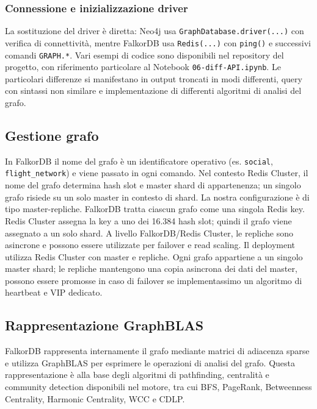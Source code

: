 \documentclass{article}
\begin{document}
\subsubsection{Connessione e inizializzazione driver}
La sostituzione del driver è diretta: Neo4j usa \texttt{GraphDatabase.driver(...)} con verifica di connettività, %
mentre FalkorDB usa \texttt{Redis(...)} con \texttt{ping()} e successivi comandi \texttt{GRAPH.*}.
Vari esempi di codice sono disponibili nel repository del progetto, con riferimento particolare al %
Notebook  \texttt{06-diff-API.ipynb}. Le particolari differenze si manifestano in output troncati in %
modi differenti, query con sintassi non similare e implementazione di differenti algoritmi di analisi del grafo. %


\subsection{Gestione grafo}
In FalkorDB il nome del grafo è un identificatore operativo (es. \texttt{social}, \texttt{flight\_network}) %
e viene passato in ogni comando. %
Nel contesto Redis Cluster, il nome del grafo determina hash slot e master shard di appartenenza; %
un singolo grafo risiede su un solo master in contesto di shard. La nostra configurazione è di tipo master-repliche.
FalkorDB tratta ciascun grafo come una singola Redis key. %
Redis Cluster assegna la key a uno dei 16.384 hash slot; quindi il grafo viene assegnato a un solo shard. %
A livello FalkorDB/Redis Cluster, le repliche sono asincrone e possono essere utilizzate per failover e read scaling.
Il deployment utilizza Redis Cluster con master e repliche. Ogni grafo appartiene a un singolo master shard; %
le repliche mantengono una copia asincrona dei dati del master, possono essere promosse in caso di failover se %
implementassimo un algoritmo di heartbeat e VIP dedicato.



\subsection{Rappresentazione GraphBLAS}

FalkorDB rappresenta internamente il grafo mediante matrici di adiacenza %
sparse e utilizza GraphBLAS per esprimere le operazioni di analisi del grafo. %
Questa rappresentazione è alla base degli algoritmi di %
pathfinding, centralità e community detection disponibili nel motore, tra cui BFS, %
PageRank, Betweenness Centrality, Harmonic Centrality, WCC e CDLP.
\end{document}
